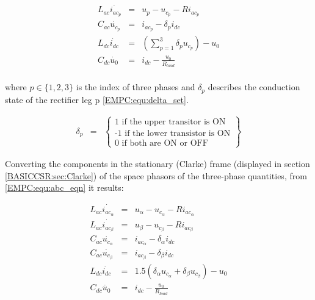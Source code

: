         \begin{equation}
        \begin{array}{rcl}
            L_{ac}\dot{i_{ac_p}}&=&u_p-u_{c_p}-Ri_{ac_p}\\
            C_{ac}\dot{u_{c_p}}&=&i_{ac_p}-\delta_pi_{dc}\\
            L_{dc}\dot{i_{dc}}&=&(\sum_{p=1}^{3}\delta_pu_{c_p})-u_0\\
            C_{dc}\dot{u_0}&=&i_{dc}-\frac{u_0}{R_{load}}\\
        \end{array}
        \label{EMPC:equ:abc_eqn}
    \end{equation}

    where $p\in\{1,2,3\}$ is the index of three phases and $\delta_p$ describes the conduction state of the rectifier leg p \ref{EMPC:equ:delta_set}.

    \begin{equation}
        \begin{array}{rcl}
            \delta_p&=&\begin{Bmatrix}
                \textrm{1 if the upper transitor is ON}\\
                \textrm{-1 if the lower transistor is ON}\\
                \textrm{0 if both are ON or OFF}
            \end{Bmatrix}
        \end{array}
        \label{EMPC:equ:delta_set}
    \end{equation}

    Converting the components in the stationary (Clarke) frame (displayed in section \ref{BASICCSR:sec:Clarke}) of the space phasors of the three-phase quantities, from \ref{EMPC:equ:abc_eqn} it results:

    \begin{equation}
        \begin{array}{rcl}
            L_{ac}\dot{i_{ac_\alpha}}&=&u_\alpha-u_{c_\alpha}-Ri_{ac_\alpha}\\
            L_{ac}\dot{i_{ac_\beta}}&=&u_\beta-u_{c_\beta}-Ri_{ac_\beta}\\
            C_{ac}\dot{u_{c_\alpha}}&=&i_{ac_\alpha}-\delta_\alpha i_{dc}\\
            C_{ac}\dot{u_{c_\beta}}&=&i_{ac_\beta}-\delta_\beta i_{dc}\\
            L_{dc}\dot{i_{dc}}&=&1.5(\delta_\alpha u_{c_\alpha}+\delta_\beta u_{c_\beta})-u_0\\
            C_{dc}\dot{u_0}&=&i_{dc}-\frac{u_0}{R_{load}}\\
        \end{array}
        \label{EMPC:equ:abc_alfabeta}
    \end{equation}


